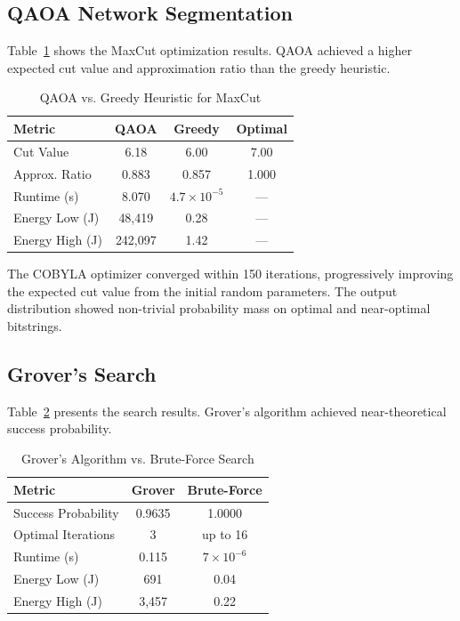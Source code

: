 \documentclass[conference]{IEEEtran}
\begin{document}
\subsection{QAOA Network Segmentation}

Table~\ref{tab:qaoa} shows the MaxCut optimization results. QAOA achieved a higher expected cut value and approximation ratio than the greedy heuristic.

\begin{table}[htbp]
\caption{QAOA vs. Greedy Heuristic for MaxCut}
\label{tab:qaoa}
\centering
\begin{tabular}{lccc}
\toprule
\textbf{Metric} & \textbf{QAOA} & \textbf{Greedy} & \textbf{Optimal} \\
\midrule
Cut Value & 6.18 & 6.00 & 7.00 \\
Approx. Ratio & 0.883 & 0.857 & 1.000 \\
Runtime (s) & 8.070 & $4.7 \times 10^{-5}$ & --- \\
Energy Low (J) & 48,419 & 0.28 & --- \\
Energy High (J) & 242,097 & 1.42 & --- \\
\bottomrule
\end{tabular}
\end{table}

The COBYLA optimizer converged within 150 iterations, progressively improving the expected cut value from the initial random parameters. The output distribution showed non-trivial probability mass on optimal and near-optimal bitstrings.

\subsection{Grover's Search}

Table~\ref{tab:grover} presents the search results. Grover's algorithm achieved near-theoretical success probability.

\begin{table}[htbp]
\caption{Grover's Algorithm vs. Brute-Force Search}
\label{tab:grover}
\centering
\begin{tabular}{lcc}
\toprule
\textbf{Metric} & \textbf{Grover} & \textbf{Brute-Force} \\
\midrule
Success Probability & 0.9635 & 1.0000 \\
Optimal Iterations & 3 & up to 16 \\
Runtime (s) & 0.115 & $7 \times 10^{-6}$ \\
Energy Low (J) & 691 & 0.04 \\
Energy High (J) & 3,457 & 0.22 \\
\bottomrule
\end{tabular}
\end{table}
\end{document}
